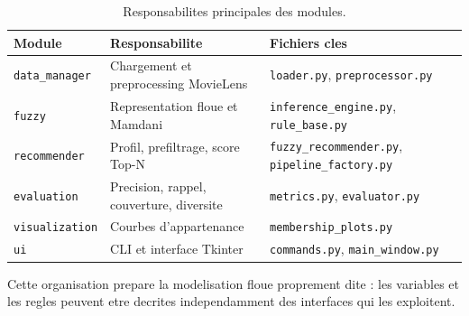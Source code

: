 \begin{table}[H]
\centering
\caption{Responsabilites principales des modules.}
\label{tab:modules}
\scriptsize
\begin{tabular}{@{}lll@{}}
\toprule
Module & Responsabilite & Fichiers cles \\
\midrule
\texttt{data\_manager} & Chargement et preprocessing MovieLens & \texttt{loader.py}, \texttt{preprocessor.py} \\
\texttt{fuzzy} & Representation floue et Mamdani & \texttt{inference\_engine.py}, \texttt{rule\_base.py} \\
\texttt{recommender} & Profil, prefiltrage, score Top-N & \texttt{fuzzy\_recommender.py}, \texttt{pipeline\_factory.py} \\
\texttt{evaluation} & Precision, rappel, couverture, diversite & \texttt{metrics.py}, \texttt{evaluator.py} \\
\texttt{visualization} & Courbes d'appartenance & \texttt{membership\_plots.py} \\
\texttt{ui} & CLI et interface Tkinter & \texttt{commands.py}, \texttt{main\_window.py} \\
\bottomrule
\end{tabular}
\end{table}

Cette organisation prepare la modelisation floue proprement dite : les variables et les regles peuvent etre decrites independamment des interfaces qui les exploitent.
